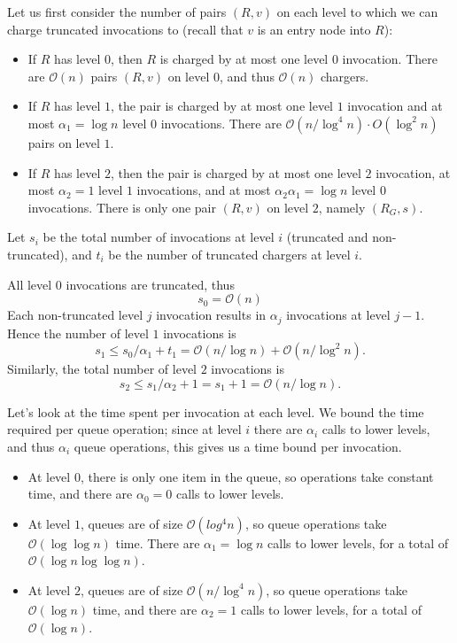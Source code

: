 \documentclass[11pt]{article}
\begin{document}
 Let us first consider the number of pairs $(R,v)$ on each level to which we can charge truncated invocations to (recall that $v$ is an entry node into $R$):
\begin{itemize}
\item If $R$ has level $0$, then $R$ is charged by at most one level $0$ invocation. There are $\mathcal{O}(n)$ pairs $(R,v)$ on level $0$, and thus $\mathcal{O}(n)$ chargers.
\item If $R$ has level $1$, the pair is charged by at most one level $1$ invocation and at most $\alpha_1 = \log n$ level $0$ invocations. There are $\mathcal{O}(n/\log^4n)\cdot O(\log^2 n)$ pairs on level $1$.
\item If $R$ has level $2$, then the pair is charged by at most one level $2$ invocation, at most $\alpha_2 = 1$ level $1$ invocations, and at most $\alpha_2\alpha_1 = \log n$ level $0$ invocations. There is only one pair $(R,v)$ on level $2$, namely $(R_G,s)$.
\end{itemize}

Let $s_i$ be the total number of invocations at level $i$ (truncated and non-truncated), and $t_i$ be the number of truncated chargers at level $i$.

All level $0$ invocations are truncated, thus
\[
s_0 = \mathcal{O}(n)
\]
 Each non-truncated level $j$ invocation results in $\alpha_j$ invocations at level $j-1$. Hence the number of level $1$ invocations is
\[
s_1 \leq s_0/\alpha_1 + t_1 = \mathcal{O}(n/\log n) + \mathcal{O}(n/\log^2 n).
\]
 Similarly, the total number of level $2$ invocations is
\[
s_2 \leq s_1/\alpha_2 + 1 = s_1 + 1 = \mathcal{O}(n/\log n).
\]

Let's look at the time spent per invocation at each level. We bound the time required per queue operation; since at level $i$ there are $\alpha_i$ calls to lower levels, and thus $\alpha_i$ queue operations, this gives us a time bound per invocation.

\begin{itemize}
\item At level $0$, there is only one item in the queue, so operations take constant time, and there are $\alpha_0 = 0$ calls to lower levels.
\item At level $1$, queues are of size $\mathcal{O}(log^4 n)$, so queue operations take $\mathcal{O}(\log \log n)$ time. There are $\alpha_1 = \log n$ calls to lower levels, for a total of $\mathcal{O}(\log n \log \log n)$.
\item At level $2$, queues are of size $\mathcal{O}(n/\log^4 n)$, so queue operations take $\mathcal{O}(\log n)$ time, and there are $\alpha_2 = 1$ calls to lower levels, for a total of $\mathcal{O}(\log n)$.
\end{itemize}
\end{document}

